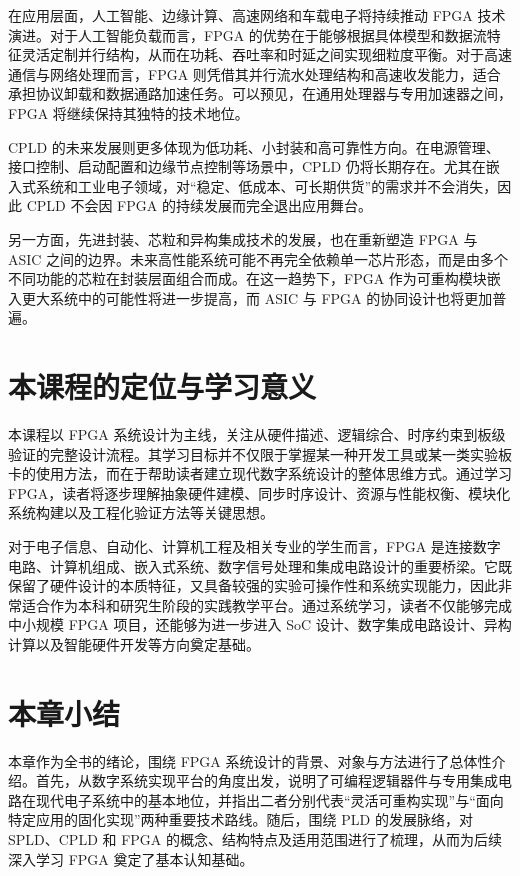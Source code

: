 在应用层面，人工智能、边缘计算、高速网络和车载电子将持续推动 FPGA
技术演进。对于人工智能负载而言，FPGA
的优势在于能够根据具体模型和数据流特征灵活定制并行结构，从而在功耗、吞吐率和时延之间实现细粒度平衡。对于高速通信与网络处理而言，FPGA
则凭借其并行流水处理结构和高速收发能力，适合承担协议卸载和数据通路加速任务。可以预见，在通用处理器与专用加速器之间，FPGA
将继续保持其独特的技术地位。

CPLD
的未来发展则更多体现为低功耗、小封装和高可靠性方向。在电源管理、接口控制、启动配置和边缘节点控制等场景中，CPLD
仍将长期存在。尤其在嵌入式系统和工业电子领域，对``稳定、低成本、可长期供货''的需求并不会消失，因此
CPLD 不会因 FPGA 的持续发展而完全退出应用舞台。

另一方面，先进封装、芯粒和异构集成技术的发展，也在重新塑造 FPGA 与 ASIC
之间的边界。未来高性能系统可能不再完全依赖单一芯片形态，而是由多个不同功能的芯粒在封装层面组合而成。在这一趋势下，FPGA
作为可重构模块嵌入更大系统中的可能性将进一步提高，而 ASIC 与 FPGA
的协同设计也将更加普遍。

\section{本课程的定位与学习意义}\label{ux672cux8bfeux7a0bux7684ux5b9aux4f4dux4e0eux5b66ux4e60ux610fux4e49}

本课程以 FPGA
系统设计为主线，关注从硬件描述、逻辑综合、时序约束到板级验证的完整设计流程。其学习目标并不仅限于掌握某一种开发工具或某一类实验板卡的使用方法，而在于帮助读者建立现代数字系统设计的整体思维方式。通过学习
FPGA，读者将逐步理解抽象硬件建模、同步时序设计、资源与性能权衡、模块化系统构建以及工程化验证方法等关键思想。

对于电子信息、自动化、计算机工程及相关专业的学生而言，FPGA
是连接数字电路、计算机组成、嵌入式系统、数字信号处理和集成电路设计的重要桥梁。它既保留了硬件设计的本质特征，又具备较强的实验可操作性和系统实现能力，因此非常适合作为本科和研究生阶段的实践教学平台。通过系统学习，读者不仅能够完成中小规模
FPGA 项目，还能够为进一步进入 SoC
设计、数字集成电路设计、异构计算以及智能硬件开发等方向奠定基础。

\section{本章小结}\label{ux672cux7ae0ux5c0fux7ed3}

本章作为全书的绪论，围绕 FPGA
系统设计的背景、对象与方法进行了总体性介绍。首先，从数字系统实现平台的角度出发，说明了可编程逻辑器件与专用集成电路在现代电子系统中的基本地位，并指出二者分别代表``灵活可重构实现''与``面向特定应用的固化实现''两种重要技术路线。随后，围绕
PLD 的发展脉络，对 SPLD、CPLD 和 FPGA
的概念、结构特点及适用范围进行了梳理，从而为后续深入学习 FPGA
奠定了基本认知基础。

